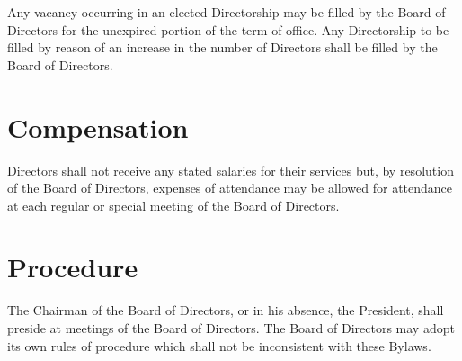 Any vacancy occurring in an elected Directorship may be filled by the Board of
Directors for the unexpired portion of the term of office.  Any Directorship to
be filled by reason of an increase in the number of Directors shall be filled by
the Board of Directors.

\section{Compensation}

Directors shall not receive any stated salaries for their services but, by
resolution of the Board of Directors, expenses of attendance may be allowed for
attendance at each regular or special meeting of the Board of Directors.

\section{Procedure}

The Chairman of the Board of Directors, or in his absence, the President, shall
preside at meetings of the Board of Directors. The Board of Directors may adopt
its own rules of procedure which shall not be inconsistent with these Bylaws.

